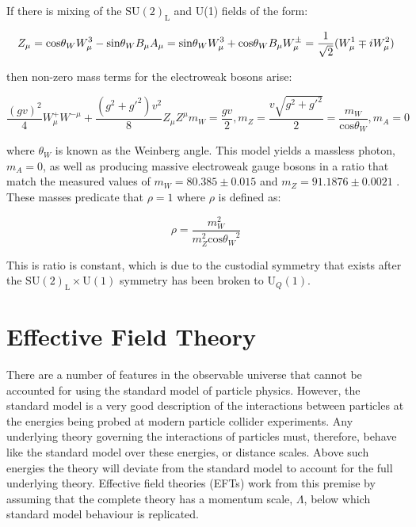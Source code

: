 If there is mixing of the $\text{SU}(2)_{\text{L}}$ and U(1) fields of the form:

\begin{equation}
Z_{\mu} = \text{cos}{\theta_{W}} W^{3}_{\mu} - \text{sin}{\theta_{W}} B_{\mu} \\
A_{\mu} = \text{sin}{\theta_{W}} W^{3}_{\mu} + \text{cos}{\theta_{W}} B_{\mu} \\
W^{\pm}_{\mu} = \frac{1}{\sqrt{2}}(W^{1}_{\mu} \mp i W^{2}_{\mu})
\end{equation}

then non-zero mass terms for the electroweak bosons arise:

\begin{equation}
\frac{(gv)^{2}}{4} W^{+}_{\mu} W^{-\mu} + \frac{(g^{2} + g'^{2})v^{2}}{8} Z_{\mu} Z^{\mu}
m_{W} = \frac{gv}{2}, m_{Z} = \frac{v\sqrt{g^{2} + g'^{2}}}{2} = \frac{m_{W}}{\text{cos}{\theta_{W}}}, m_{A} = 0
\end{equation}

where $\theta_{W}$ is known as the Weinberg angle.  This model yields a massless photon, $m_{A} = 0$, as well as producing massive electroweak gauge bosons in a ratio that match the measured values of $m_{W} = 80.385 \pm 0.015$ and $m_{Z} = 91.1876 \pm 0.0021$ \cite{Beringer:1900zz}.  These masses predicate that $\rho = 1$ where $\rho$ is defined as:

\begin{equation}
\rho = \frac{m_{W}^{2}}{m_{Z}^{2}\text{cos}{\theta_{W}}^{2}}
\label{equ:custodialsymmetry}
\end{equation}

This is ratio is constant, which is due to the custodial symmetry that exists after the $\text{SU}(2)_{\text{L}} \times \text{U}(1)$ symmetry has been broken to $\text{U}_{Q}(1)$.


\section{Effective Field Theory}
There are a number of features in the observable universe that cannot be accounted for using the standard model of particle physics.  However, the standard model is a very good description of the interactions between particles at the energies being probed at modern particle collider experiments.  Any underlying theory governing the interactions of particles must, therefore, behave like the standard model over these energies, or distance scales.  Above such energies the theory will deviate from the standard model to account for the full underlying theory.  Effective field theories (EFTs) work from this premise by assuming that the complete theory  has a momentum scale, $\Lambda$, below which standard model behaviour is replicated.  

